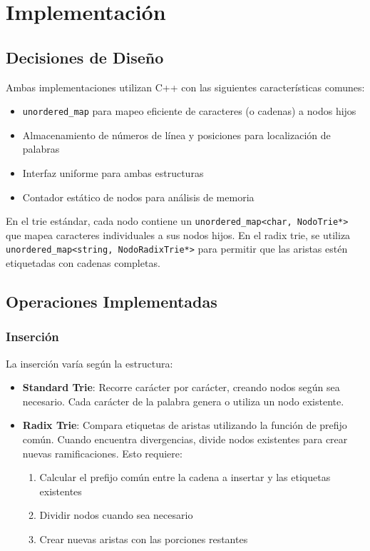 \documentclass[11pt,a4paper]{article}
\begin{document}
\section{Implementación}

\subsection{Decisiones de Diseño}

Ambas implementaciones utilizan C++ con las siguientes características comunes:

\begin{itemize}
    \item \texttt{unordered\_map} para mapeo eficiente de caracteres (o cadenas) a nodos hijos
    \item Almacenamiento de números de línea y posiciones para localización de palabras
    \item Interfaz uniforme para ambas estructuras
    \item Contador estático de nodos para análisis de memoria
\end{itemize}

En el trie estándar, cada nodo contiene un \texttt{unordered\_map<char, NodoTrie*>} que mapea caracteres individuales a sus nodos hijos. En el radix trie, se utiliza \texttt{unordered\_map<string, NodoRadixTrie*>} para permitir que las aristas estén etiquetadas con cadenas completas.

\subsection{Operaciones Implementadas}

\subsubsection{Inserción}

La inserción varía según la estructura:

\begin{itemize}
    \item \textbf{Standard Trie}: Recorre carácter por carácter, creando nodos según sea necesario. Cada carácter de la palabra genera o utiliza un nodo existente.
    
    \item \textbf{Radix Trie}: Compara etiquetas de aristas utilizando la función de prefijo común. Cuando encuentra divergencias, divide nodos existentes para crear nuevas ramificaciones. Esto requiere:
    \begin{enumerate}
        \item Calcular el prefijo común entre la cadena a insertar y las etiquetas existentes
        \item Dividir nodos cuando sea necesario
        \item Crear nuevas aristas con las porciones restantes
    \end{enumerate}
\end{itemize}
\end{document}
